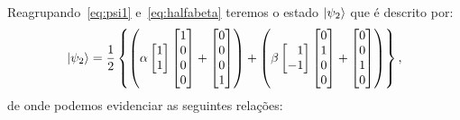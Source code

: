 Reagrupando~\eqref{eq:psi1} e~\eqref{eq:halfabeta} teremos o estado $\ket{\psi_2}$ que é descrito por:
\begin{align}\label{eq:psi2matrix}
\ket{\psi_2} = \frac{1}{2} \left\{\left( \alpha \begin{bmatrix}
1 \\
1 
\end{bmatrix} \begin{bmatrix}
1 \\
0 \\
0 \\
0
\end{bmatrix} +\begin{bmatrix}
0 \\
0 \\
0 \\
1
\end{bmatrix} \right) + \left(\beta \begin{bmatrix*}[r]
1 \\
-1
\end{bmatrix*} \begin{bmatrix}
0 \\
1 \\
0 \\
0
\end{bmatrix} + \begin{bmatrix}
0 \\
0 \\
1 \\
0
\end{bmatrix}\right)\right\},
\end{align}
de onde podemos evidenciar as seguintes relações:
